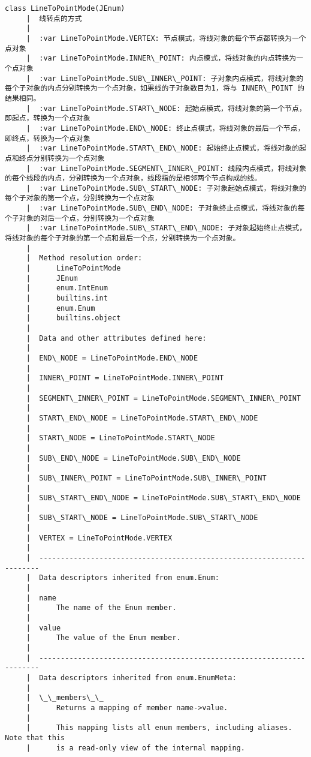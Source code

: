 \documentclass[11pt]{article}
\begin{document}
\begin{Verbatim}[commandchars=\\\{\}]
    class LineToPointMode(JEnum)
     |  线转点的方式
     |  
     |  :var LineToPointMode.VERTEX: 节点模式，将线对象的每个节点都转换为一个点对象
     |  :var LineToPointMode.INNER\_POINT: 内点模式，将线对象的内点转换为一个点对象
     |  :var LineToPointMode.SUB\_INNER\_POINT: 子对象内点模式，将线对象的每个子对象的内点分别转换为一个点对象，如果线的子对象数目为1，将与 INNER\_POINT 的结果相同。
     |  :var LineToPointMode.START\_NODE: 起始点模式，将线对象的第一个节点，即起点，转换为一个点对象
     |  :var LineToPointMode.END\_NODE: 终止点模式，将线对象的最后一个节点，即终点，转换为一个点对象
     |  :var LineToPointMode.START\_END\_NODE: 起始终止点模式，将线对象的起点和终点分别转换为一个点对象
     |  :var LineToPointMode.SEGMENT\_INNER\_POINT: 线段内点模式，将线对象的每个线段的内点，分别转换为一个点对象，线段指的是相邻两个节点构成的线。
     |  :var LineToPointMode.SUB\_START\_NODE: 子对象起始点模式，将线对象的每个子对象的第一个点，分别转换为一个点对象
     |  :var LineToPointMode.SUB\_END\_NODE: 子对象终止点模式，将线对象的每个子对象的对后一个点，分别转换为一个点对象
     |  :var LineToPointMode.SUB\_START\_END\_NODE: 子对象起始终止点模式，将线对象的每个子对象的第一个点和最后一个点，分别转换为一个点对象。
     |  
     |  Method resolution order:
     |      LineToPointMode
     |      JEnum
     |      enum.IntEnum
     |      builtins.int
     |      enum.Enum
     |      builtins.object
     |  
     |  Data and other attributes defined here:
     |  
     |  END\_NODE = LineToPointMode.END\_NODE
     |  
     |  INNER\_POINT = LineToPointMode.INNER\_POINT
     |  
     |  SEGMENT\_INNER\_POINT = LineToPointMode.SEGMENT\_INNER\_POINT
     |  
     |  START\_END\_NODE = LineToPointMode.START\_END\_NODE
     |  
     |  START\_NODE = LineToPointMode.START\_NODE
     |  
     |  SUB\_END\_NODE = LineToPointMode.SUB\_END\_NODE
     |  
     |  SUB\_INNER\_POINT = LineToPointMode.SUB\_INNER\_POINT
     |  
     |  SUB\_START\_END\_NODE = LineToPointMode.SUB\_START\_END\_NODE
     |  
     |  SUB\_START\_NODE = LineToPointMode.SUB\_START\_NODE
     |  
     |  VERTEX = LineToPointMode.VERTEX
     |  
     |  ----------------------------------------------------------------------
     |  Data descriptors inherited from enum.Enum:
     |  
     |  name
     |      The name of the Enum member.
     |  
     |  value
     |      The value of the Enum member.
     |  
     |  ----------------------------------------------------------------------
     |  Data descriptors inherited from enum.EnumMeta:
     |  
     |  \_\_members\_\_
     |      Returns a mapping of member name->value.
     |      
     |      This mapping lists all enum members, including aliases. Note that this
     |      is a read-only view of the internal mapping.
    

\end{Verbatim}
\end{document}
